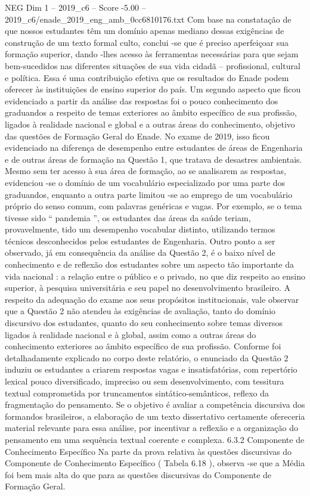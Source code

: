 \begin{textsample}{NEG Dim 1 – 2019\_c6 – Score -5.00 – 2019\_c6/enade\_2019\_eng\_amb\_0cc6810176.txt}
Com base na constatação de que nossos estudantes têm um domínio apenas mediano dessas exigências de construção de um texto formal culto, conclui -se que é preciso aperfeiçoar sua formação superior, dando -lhes acesso às ferramentas necessárias para que sejam bem-sucedidos nas diferentes situações de sua vida cidadã – profissional, cultural e política.
Essa é uma contribuição efetiva que os resultados do Enade podem oferecer às instituições de ensino superior do país.
Um segundo aspecto que ficou evidenciado a partir da análise das respostas foi o pouco conhecimento dos graduandos a respeito de temas exteriores ao âmbito específico de sua profissão, ligados à realidade nacional e global e a outras áreas do conhecimento, objetivo das questões de Formação Geral do Enade.
No exame de 2019, isso ficou evidenciado na diferença de desempenho entre estudantes de áreas de Engenharia e de outras áreas de formação na Questão 1, que tratava de desastres ambientais.
Mesmo sem ter acesso à sua área de formação, ao se analisarem as respostas, evidenciou -se o domínio de um vocabulário especializado por uma parte dos graduandos, enquanto a outra parte limitou -se ao emprego de um vocabulário próprio do senso comum, com palavras genéricas e vagas.
Por exemplo, se o tema tivesse sido “ pandemia ”, os estudantes das áreas da saúde teriam, provavelmente, tido um desempenho vocabular distinto, utilizando termos técnicos desconhecidos pelos estudantes de Engenharia.
Outro ponto a ser observado, já em consequência da análise da Questão 2, é o baixo nível de conhecimento e de reflexão dos estudantes sobre um aspecto tão importante da vida nacional : a relação entre o público e o privado, no que diz respeito ao ensino superior, à pesquisa universitária e seu papel no desenvolvimento brasileiro.
A respeito da adequação do exame aos seus propósitos institucionais, vale observar que a Questão 2 não atendeu às exigências de avaliação, tanto do domínio discursivo dos estudantes, quanto do seu conhecimento sobre temas diversos ligados à realidade nacional e à global, assim como a outras áreas do conhecimento exteriores ao âmbito específico de sua profissão.
Conforme foi detalhadamente explicado no corpo deste relatório, o enunciado da Questão 2 induziu os estudantes a criarem respostas vagas e insatisfatórias, com repertório lexical pouco diversificado, impreciso ou sem desenvolvimento, com tessitura textual comprometida por truncamentos sintático-semânticos, reflexo da fragmentação do pensamento.
Se o objetivo é avaliar a competência discursiva dos formandos brasileiros, a elaboração de um texto dissertativo certamente ofereceria material relevante para essa análise, por incentivar a reflexão e a organização do pensamento em uma sequência textual coerente e complexa. 6.3.2 Componente de Conhecimento Específico Na parte da prova relativa às questões discursivas do Componente de Conhecimento Específico ( Tabela 6.18 ), observa -se que a Média foi bem mais alta do que para as questões discursivas do Componente de Formação Geral.

\end{textsample}
